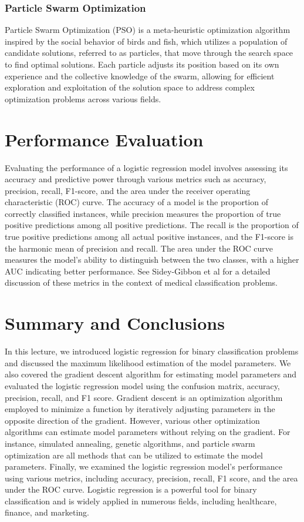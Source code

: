 \documentclass{article}[12pt]
\begin{document}
\subsubsection*{Particle Swarm Optimization}
Particle Swarm Optimization (PSO) is a meta-heuristic optimization algorithm inspired by the social behavior of birds and fish, which utilizes a population of candidate solutions, referred to as particles, that move through the search space to find optimal solutions. 
Each particle adjusts its position based on its own experience and the collective knowledge of the swarm, allowing for efficient exploration and exploitation of the solution space to address complex optimization problems across various fields.


\section{Performance Evaluation}
Evaluating the performance of a logistic regression model involves assessing its accuracy and predictive power through various metrics such as accuracy, precision, recall, F1-score, and the area under the receiver operating characteristic (ROC) curve.
The accuracy of a model is the proportion of correctly classified instances, while precision measures the proportion of true positive predictions among all positive predictions. 
The recall is the proportion of true positive predictions among all actual positive instances, and the F1-score is the harmonic mean of precision and recall. 
The area under the ROC curve measures the model's ability to distinguish between the two classes, with a higher AUC indicating better performance.
See Sidey-Gibbon et al \cite{SG2019} for a detailed discussion of these metrics in the context of medical classification problems.

\section{Summary and Conclusions}
In this lecture, we introduced logistic regression for binary classification problems and discussed the maximum likelihood estimation of the model parameters. We also covered the gradient descent algorithm for estimating model parameters and evaluated the logistic regression model using the confusion matrix, accuracy, precision, recall, and F1 score. Gradient descent is an optimization algorithm employed to minimize a function by iteratively adjusting parameters in the opposite direction of the gradient. However, various other optimization algorithms can estimate model parameters without relying on the gradient. For instance, simulated annealing, genetic algorithms, and particle swarm optimization are all methods that can be utilized to estimate the model parameters. Finally, we examined the logistic regression model's performance using various metrics, including accuracy, precision, recall, F1 score, and the area under the ROC curve. Logistic regression is a powerful tool for binary classification and is widely applied in numerous fields, including healthcare, finance, and marketing.



\end{document}
